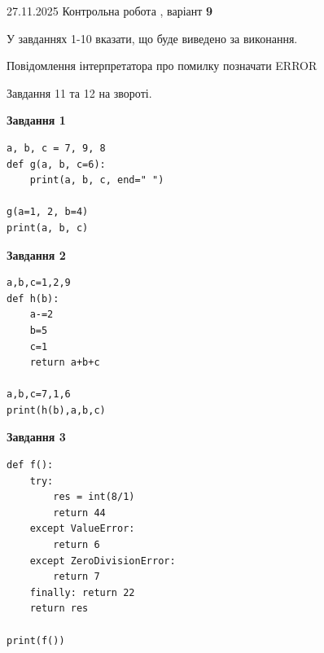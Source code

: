 \documentclass[12pt, ukrainian]{article}
\begin{document}
{{{{{{{{{{ 27.11.2025 Контрольна робота , варіант  \No \textbf { 9 }\par}}
{

{%



У завданнях 1-10 вказати, що буде виведено за виконання.

Повідомлення інтерпретатора про помилку позначати ERROR

Завдання 11 та 12 на звороті.

\begin{minipage}[t]{7.5cm}

\begin{center}
\textbf{Завдання 1}
\end{center}

\begin{verbatim}
a, b, c = 7, 9, 8
def g(a, b, c=6):
    print(a, b, c, end=" ")

g(a=1, 2, b=4)
print(a, b, c)
\end{verbatim}



\begin{center}
\textbf{Завдання 2}
\end{center}

\begin{verbatim}
a,b,c=1,2,9
def h(b):
    a-=2
    b=5
    c=1
    return a+b+c

a,b,c=7,1,6
print(h(b),a,b,c)
\end{verbatim}



\begin{center}
\textbf{Завдання 3}
\end{center}

\begin{verbatim}
def f():
    try:
        res = int(8/1)
        return 44
    except ValueError: 
        return 6
    except ZeroDivisionError: 
        return 7
    finally: return 22
    return res

print(f())
\end{verbatim}




\end{minipage}}}}}}}}}}}
\end{document}

